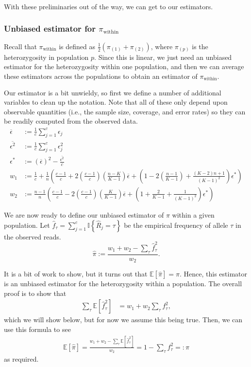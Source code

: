 \documentclass[a4paper,fontsize=9pt,DIV=14]{scrartcl}
\newcommand*{\piw}{$\pi_\text{within}$\xspace}
\begin{document}
With these preliminaries out of the way, we can get to our estimators.


\subsubsection*{Unbiased estimator for \piw}
\label{supp:sec:FST:sub:HeterozygositySequencingError:sub:UnbiasedPIW}

Recall that \piw is defined as $\frac{1}{2}\left(\pi_{(1)} + \pi_{(2)}\right)$, where $\pi_{(p)}$ is the heterozygosity in population $p$.  Since this is linear, we just need an unbiased estimator for the heterozygosity within one population, and then we can average these estimators across the populations to obtain an estimator of \piw.

Our estimator is a bit unwieldy, so first we define a number of additional variables to clean up the notation.  Note that all of these only depend upon observable quantities (i.e., the sample size, coverage, and error rates) so they can be readily computed from the observed data.
\begin{align*}
\overline{\epsilon} &:= \frac{1}{c} \sum_{j=1}^c \epsilon_j\\
\overline{\epsilon^2} &:= \frac{1}{c} \sum_{j=1}^c \epsilon_j^2\\
\epsilon^* &:= (\overline{\epsilon})^2 - \frac{\overline{\epsilon^2}}{c}\\
w_1 &:= \frac{1}{c} + \frac{1}{n}\left(\frac{c-1}{c} + 2\left(\frac{c-1}{c}\right)\left(\frac{n-K}{K-1}\right)\overline{\epsilon} + \left(1 - 2\left(\frac{n-1}{K-1}\right) + \frac{(K-2)n + 1}{(K-1)^2}\right)\epsilon^*\right)\\
w_2 &:= \frac{n-1}{n}\left(\frac{c-1}{c} - 2\left(\frac{c-1}{c}\right)\left(\frac{K}{K-1}\right)\overline{\epsilon} + \left(1 + \frac{2}{K-1} + \frac{1}{(K-1)^2}\right)\epsilon^*\right)
\end{align*}

We are now ready to define our unbiased estimator of $\pi$ within a given population.  Let $\hat{f}_\tau = \sum_{j=1}^c \mathbb{I}\left\{\hat{R}_j = \tau\right\}$ be the empirical frequency of allele $\tau$ in the observed reads.
\[
\widehat{\pi} := \frac{w_1 + w_2 - \sum_\tau \hat{f}_\tau^2}{w_2}.
\]

It is a bit of work to show, but it turns out that $\mathbb{E}[\widehat{\pi}] = \pi$. Hence, this estimator is an unbiased estimator for the heterozygosity within a population.  The overall proof is to show that
\begin{align}
\sum_\tau\mathbb{E}\left[\hat{f}_\tau^2\right] &= w_1 + w_2 \sum_\tau f_\tau^2, \label{eq:lemma}
\end{align}
which we will show below, but for now we assume this being true.  Then, we can use this formula to see
\begin{align*}
\mathbb{E}\left[\widehat{\pi}\right] = \frac{w_1 + w_2 - \sum_\tau \mathbb{E}\left[\hat{f}_\tau^2\right]}{w_2} = 1 -\sum_\tau f_\tau^2 =: \pi
\end{align*}
as required.
\end{document}
